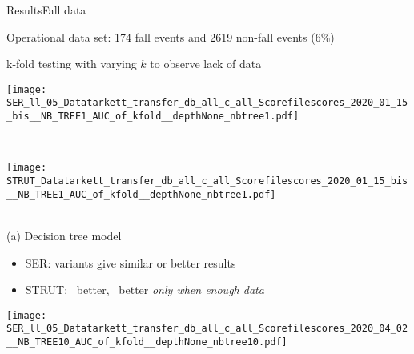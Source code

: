 \begin{frame}{Results}{Fall data}

\centering

Operational data set: 174 fall events and 2619 non-fall events (6\%)

k-fold testing with varying $k$ to observe lack of data

\vspace{-0.2cm}
\renewcommand{\ratio}{0.60}
    \begin{minipage}[t]{0.49\linewidth}\vspace{0pt}
        \centering
        \begin{minipage}[t]{\ratio\linewidth}\vspace{0pt}
        \centerline{\texttt{[image: SER\_ll\_05\_Datatarkett\_transfer\_db\_all\_c\_all\_Scorefilescores\_2020\_01\_15\_bis\_\_NB\_TREE1\_AUC\_of\_kfold\_\_depthNone\_nbtree1.pdf]}}
        \end{minipage}\\
        \begin{minipage}[t]{\ratio\linewidth}\vspace{0cm}
        \centerline{\texttt{[image: STRUT\_Datatarkett\_transfer\_db\_all\_c\_all\_Scorefilescores\_2020\_01\_15\_bis\_\_NB\_TREE1\_AUC\_of\_kfold\_\_depthNone\_nbtree1.pdf]}}
        \end{minipage}\\
        {\small(a)\; Decision tree model}
\begin{itemize}
    \item SER: variants give similar or better results
    \item STRUT: \strutnd\ better, \struthi\ better \textit{only when enough data}
\end{itemize}
    \end{minipage}\hspace{-0.5cm}
    \begin{minipage}[t]{0.49\linewidth}\vspace{0pt}
        \centering
        \begin{minipage}[t]{\ratio\linewidth}\vspace{0pt}
        \centerline{\texttt{[image: SER\_ll\_05\_Datatarkett\_transfer\_db\_all\_c\_all\_Scorefilescores\_2020\_04\_02\_\_NB\_TREE10\_AUC\_of\_kfold\_\_depthNone\_nbtree10.pdf]}}
        \end{minipage}\\

\end{minipage}
\end{frame}
